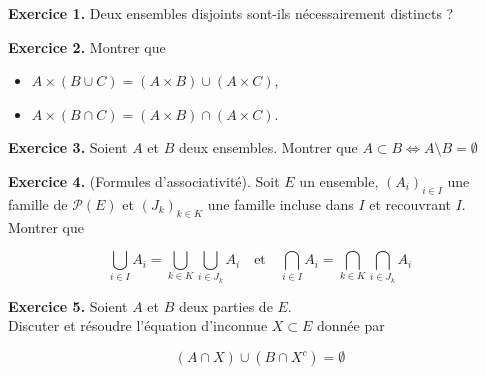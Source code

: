 \documentclass[a4paper, 10pt]{report}
\begin{document}
	
	\renewcommand{\headrule}{%
		\vspace{-4pt}\hrulefill
		\raisebox{-6.8pt}{\ \texttt{[image: ../../icon.png]}}
		\hrulefill
	}	
	\pagestyle{fancy}
	\fancyhf{}
	
	
	\noindent
	\textbf{Exercice 1.} Deux ensembles disjoints sont-ils
	nécessairement distincts ?	
	
	\vspace{5mm}
	\noindent
	\textbf{Exercice 2.} Montrer que
	
	\begin{itemize}
		\item $A \times (B \cup C) = (A \times B) \cup (A \times C)$,
		\item $A \times (B \cap C) = (A \times B) \cap (A \times C)$.
	\end{itemize}
	
	\vspace{5mm}
	\noindent
	\textbf{Exercice 3.} Soient $A$ et $B$ deux ensembles. Montrer que
	$A \subset B \iff A \setminus B = \emptyset$
		
	\vspace{5mm}
	\noindent
	\textbf{Exercice 4.} (Formules d'associativité). Soit $E$ un
	ensemble, $(A_i)_{i \in I}$ une famille de $\mathcal{P}(E)$ et
	$(J_k)_{k \in K}$ une famille incluse dans $I$ et recouvrant $I$.
	Montrer que
	
	\[
		\bigcup\limits_{i \in I} A_i =
			\bigcup\limits_{k \in K}\bigcup\limits_{i \in J_k} A_i
		\quad \text{et} \quad
		\bigcap\limits_{i \in I} A_i =
			\bigcap\limits_{k \in K}\bigcap\limits_{i \in J_k} A_i
	\]
	
	\vspace{5mm}
	\noindent
	{\color{red}\textbf{Exercice 5.}}
	Soient $A$ et $B$ deux parties de $E$.\\
	Discuter et résoudre l'équation d'inconnue $X \subset E$ donnée par
	
	\[(A \cap X) \cup (B \cap X^c) = \emptyset\]
	
\end{document}
